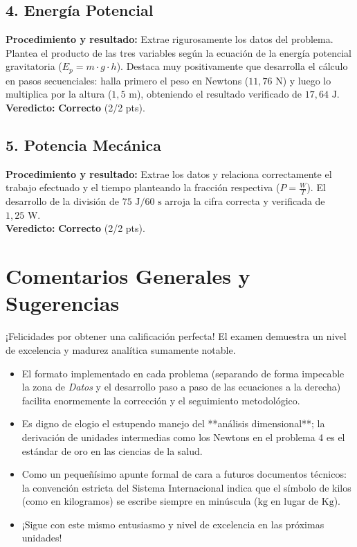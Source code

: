\documentclass[12pt,letterpaper]{article}
\begin{document}
\subsection*{4. Energía Potencial}
\textbf{Procedimiento y resultado:} Extrae rigurosamente los datos del problema. Plantea el producto de las tres variables según la ecuación de la energía potencial gravitatoria ($E_p = m \cdot g \cdot h$). Destaca muy positivamente que desarrolla el cálculo en pasos secuenciales: halla primero el peso en Newtons ($11,76 \text{ N}$) y luego lo multiplica por la altura ($1,5 \text{ m}$), obteniendo el resultado verificado de $17,64 \text{ J}$. \\
\textbf{Veredicto:} \textbf{Correcto} (2/2 pts).

\subsection*{5. Potencia Mecánica}
\textbf{Procedimiento y resultado:} Extrae los datos y relaciona correctamente el trabajo efectuado y el tiempo planteando la fracción respectiva ($P = \frac{W}{T}$). El desarrollo de la división de $75 \text{ J} / 60 \text{ s}$ arroja la cifra correcta y verificada de $1,25 \text{ W}$. \\
\textbf{Veredicto:} \textbf{Correcto} (2/2 pts).

\vspace{0.5cm}
\section*{Comentarios Generales y Sugerencias}
¡Felicidades por obtener una calificación perfecta! El examen demuestra un nivel de excelencia y madurez analítica sumamente notable.
\begin{itemize}
    \item El formato implementado en cada problema (separando de forma impecable la zona de \textit{Datos} y el desarrollo paso a paso de las ecuaciones a la derecha) facilita enormemente la corrección y el seguimiento metodológico.
    \item Es digno de elogio el estupendo manejo del **análisis dimensional**; la derivación de unidades intermedias como los Newtons en el problema 4 es el estándar de oro en las ciencias de la salud.
    \item Como un pequeñísimo apunte formal de cara a futuros documentos técnicos: la convención estricta del Sistema Internacional indica que el símbolo de kilos (como en kilogramos) se escribe siempre en minúscula ($\text{kg}$ en lugar de $\text{Kg}$).
    \item ¡Sigue con este mismo entusiasmo y nivel de excelencia en las próximas unidades!
\end{itemize}
\end{document}
